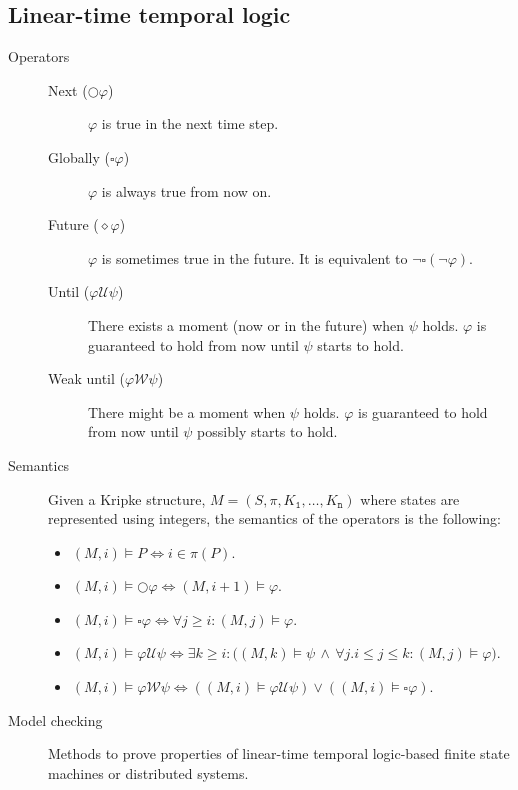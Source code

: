 \subsection{Linear-time temporal logic}

\begin{description}
    \item[Operators] \phantom{}
        \begin{description}
            \item[Next ($\bigcirc \varphi$)] 
                $\varphi$ is true in the next time step.

            \item[Globally ($\square \varphi$)] 
                $\varphi$ is always true from now on.

            \item[Future ($\diamond \varphi$)] 
                $\varphi$ is sometimes true in the future.
                It is equivalent to $\lnot\square(\lnot \varphi)$.

            \item[Until ($\varphi \mathcal{U} \psi$)] 
                There exists a moment (now or in the future) when $\psi$ holds. 
                $\varphi$ is guaranteed to hold from now until $\psi$ starts to hold.

            \item[Weak until ($\varphi \mathcal{W} \psi$)] 
                There might be a moment when $\psi$ holds. 
                $\varphi$ is guaranteed to hold from now until $\psi$ possibly starts to hold.
        \end{description}

    \item[Semantics]
        Given a Kripke structure, $M = (S, \pi, K_\texttt{1}, \dots, K_\texttt{n})$ where states are represented using integers,
        the semantics of the operators is the following:
        \begin{itemize}
            \item $(M, i) \models P \iff i \in \pi(P)$.
            \item $(M, i) \models \bigcirc\varphi \iff (M, i+1) \models \varphi$.
            \item $(M, i) \models \square\varphi \iff \forall j \geq i: (M, j) \models \varphi$.
            \item $(M, i) \models \varphi \mathcal{U} \psi \iff \exists k \geq i: \big( (M, k) \models \psi \,\land\, \forall j. i \leq j \leq k: (M, j) \models \varphi \big)$.
            \item $(M, i) \models \varphi \mathcal{W} \psi \iff ((M, i) \models \varphi \mathcal{U} \psi) \vee ((M, i) \models \square\varphi)$.
        \end{itemize}

    \item[Model checking] 
        Methods to prove properties of linear-time temporal logic-based finite state machines or distributed systems.
\end{description}